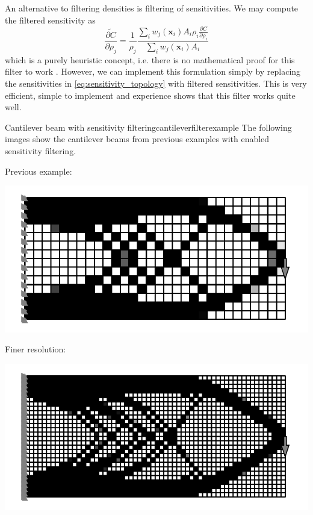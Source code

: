 An alternative to filtering densities is filtering of sensitivities. We may compute the filtered sensitivity as
\begin{equation}
    \widetilde{\frac{\partial C}{\partial \rho_j}} = \frac{1}{\rho_j} \frac{\sum_i w_j(\mathbf{x}_i) A_i \rho_i \frac{\partial C}{\partial \rho_i} }{\sum_i w_j(\mathbf{x}_i) A_i}
\end{equation}
which is a purely heuristic concept, i.e. there is no mathematical proof for this filter to work \cite{Sigmund1998}. However, we can implement this formulation simply by replacing the sensitivities in \eqref{eq:sensitivity_topology} with filtered sensitivities. This is very efficient, simple to implement and experience shows that this filter works quite well.

\begin{example}{Cantilever beam  with sensitivity filtering}{cantileverfilterexample}
    The following images show the cantilever beams from previous examples with enabled sensitivity filtering.

    Previous example:
    \begin{center}
        \includegraphics[width=\linewidth]{figures/cantilever_fem_optimized_binary.pdf}
    \end{center}
    
    Finer resolution:
    \begin{center}
        \includegraphics[width=\linewidth]{figures/cantilever_fem_optimized_binary_fine.pdf}
    \end{center}
    

\end{example}
